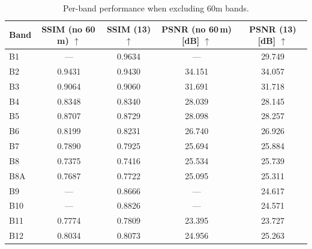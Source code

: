 \begin{table}[h!]
    \centering
    \setlength{\tabcolsep}{6pt}
    \renewcommand{\arraystretch}{1.15}
    \caption[Per-band performance when excluding 60m bands]{Per-band performance when excluding 60m bands.}
    \label{tab:ablation_excluding_60m_per_band}
    \begin{tabular}{lcccc}
    \hline
    \textbf{Band} & \textbf{SSIM (no 60\,m)} $\uparrow$ & \textbf{SSIM (13)} $\uparrow$ & \textbf{PSNR (no 60\,m) [dB]} $\uparrow$ & \textbf{PSNR (13) [dB]} $\uparrow$ \\
    \hline
    B1   & ---    & 0.9634 & ---    & 29.749 \\
    B2   & 0.9431 & 0.9430 & 34.151 & 34.057 \\
    B3   & 0.9064 & 0.9060 & 31.691 & 31.718 \\
    B4   & 0.8348 & 0.8340 & 28.039 & 28.145 \\
    B5   & 0.8707 & 0.8729 & 28.098 & 28.257 \\
    B6   & 0.8199 & 0.8231 & 26.740 & 26.926 \\
    B7   & 0.7890 & 0.7925 & 25.694 & 25.884 \\
    B8   & 0.7375 & 0.7416 & 25.534 & 25.739 \\
    B8A  & 0.7687 & 0.7722 & 25.095 & 25.311 \\
    B9   & ---    & 0.8666 & ---    & 24.617 \\
    B10  & ---    & 0.8826 & ---    & 24.571 \\
    B11  & 0.7774 & 0.7809 & 23.395 & 23.727 \\
    B12  & 0.8034 & 0.8073 & 24.956 & 25.263 \\
    \hline
    \end{tabular}
\end{table}
